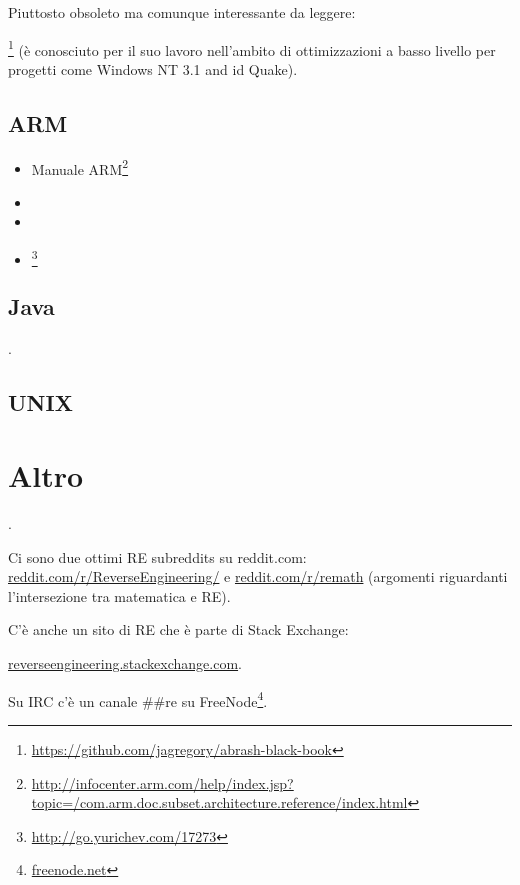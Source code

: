 Piuttosto obsoleto ma comunque interessante da leggere:

\MAbrash\footnote{\AlsoAvailableAs \url{https://github.com/jagregory/abrash-black-book}}
(è conosciuto per il suo lavoro nell'ambito di ottimizzazioni a basso livello per progetti come Windows NT 3.1 and id Quake).

\subsection{ARM}

\begin{itemize}
\item Manuale ARM\footnote{\AlsoAvailableAs \url{http://infocenter.arm.com/help/index.jsp?topic=/com.arm.doc.subset.architecture.reference/index.html}}

\item \ARMSevenRef

\item \ARMSixFourRefURL

\item \ARMCookBook\footnote{\AlsoAvailableAs \url{http://go.yurichev.com/17273}}
\end{itemize}

\subsection{Java}

\JavaBook.

\subsection{UNIX}

\TAOUP



\section{Altro}

\HenryWarren.

Ci sono due ottimi \ac{RE} subreddits su reddit.com:
\href{http://go.yurichev.com/17027}{reddit.com/r/ReverseEngineering/} e
\href{http://go.yurichev.com/17028}{reddit.com/r/remath}
(argomenti riguardanti l'intersezione tra matematica e \ac{RE}).

C'è anche un sito di \ac{RE} che è parte di Stack Exchange:

\par \href{http://go.yurichev.com/17029}{reverseengineering.stackexchange.com}.

Su IRC c'è un canale \#\#re su
FreeNode\footnote{\href{http://go.yurichev.com/17030}{freenode.net}}.

